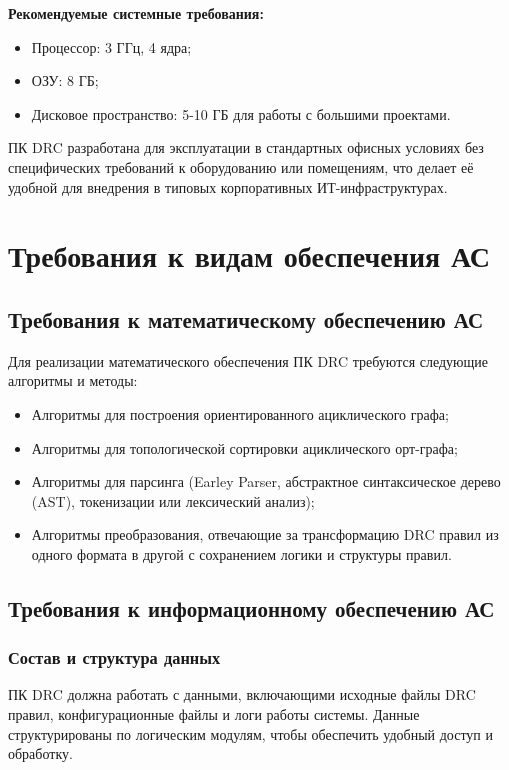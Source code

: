 \textbf{Рекомендуемые системные требования:}

\begin{itemize}
	\item Процессор: 3 ГГц, 4 ядра;
	\item ОЗУ: 8 ГБ;
	\item Дисковое пространство: 5-10 ГБ для работы с большими проектами.
\end{itemize}
  
ПК DRC разработана для эксплуатации в стандартных офисных условиях
без специфических требований к оборудованию или помещениям,
что делает её удобной для внедрения
в типовых корпоративных ИТ-инфраструктурах. 

\section{Требования к видам обеспечения АС}

\subsection{Требования к математическому обеспечению АС}

Для реализации математического обеспечения ПК DRC
требуются следующие алгоритмы и методы:

\begin{itemize}
	\item Алгоритмы для построения ориентированного ациклического графа;
	\item Алгоритмы для топологической сортировки ациклического орт-графа;
	\item Алгоритмы для парсинга
		(Earley Parser, абстрактное синтаксическое дерево (AST),
		токенизации или лексический анализ);
	\item Алгоритмы преобразования, отвечающие за трансформацию DRC
		правил из одного формата в другой с сохранением логики
		и структуры правил.
\end{itemize}

\subsection{Требования к информационному обеспечению АС}

\subsubsection{Состав и структура данных}

ПК DRC должна работать с данными, включающими исходные файлы DRC правил,
конфигурационные файлы и логи работы системы.
Данные структурированы по логическим модулям,
чтобы обеспечить удобный доступ и обработку.

